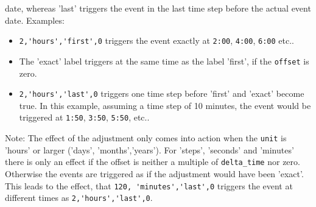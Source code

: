 \documentclass[twoside]{article}
\begin{document}
\begin{itemize}
      date, whereas 'last' triggers the event in the last time step before the 
      actual event date. Examples:
      \begin{itemize}
        \item \verb|2,'hours','first',0| triggers the event exactly at
          \verb|2:00|, \verb|4:00|, \verb|6:00| etc..
        \item The 'exact' label triggers at the same time as the label 'first',
          if the \verb|offset| is zero.
        \item \verb|2,'hours','last',0| triggers one time step before 
          'first' 
          and 'exact' become true. In this example, assuming a time step of
          10 minutes, the event would be triggered 
          at \verb|1:50|, \verb|3:50|, \verb|5:50|, etc..
      \end{itemize}
      Note: The effect of the adjustment only comes into action when the 
      \verb|unit| is 'hours' or larger ('days', 'months','years'). 
      For 'steps',
      'seconds' and 'minutes' there is only an effect if the offset is neither a
      multiple of \verb|delta_time| nor zero. 
      Otherwise the events are triggered
      as if the adjustment would have been 'exact'.
      This leads to the effect,
      that \verb|120, 'minutes','last',0| triggers the event at
      different times
      as \verb|2,'hours','last',0|.


\end{itemize}
\end{document}
